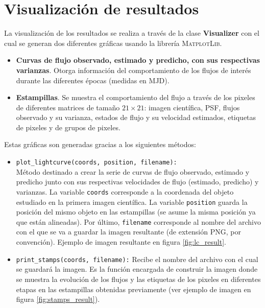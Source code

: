 \section{Visualizaci\'on de resultados}
La visualizaci\'on de los resultados se realiza a trav\'es de la clase \textbf{Visualizer} con el cual se generan dos diferentes gr\'aficas usando la librer\'ia \textsc{MatplotLib}. 
\begin{itemize}
\item \textbf{Curvas de flujo observado, estimado y predicho, con sus respectivas varianzas}. Otorga informaci\'on del comportamiento de los flujos de inter\'es durante las diferentes \'epocas (medidas en MJD). 
\item \textbf{Estampillas}. Se muestra el comportamiento del flujo a trav\'es de los pixeles de diferentes matrices de tama\~no $21 \times 21$: imagen cient\'ifica, PSF, flujos observado y su varianza, estados de flujo y su velocidad estimados, etiquetas de pixeles y de grupos de pixeles.
\end{itemize}

Estas gr\'aficas son generadas gracias a los siguientes m\'etodos:

\begin{itemize}
\item \texttt{plot\_lightcurve(coords, position, filename):}\\
M\'etodo destinado a crear la serie de curvas de flujo observado, estimado y predicho junto con sus respectivas velocidades de flujo (estimado, predicho) y varianzas. La variable \texttt{coords} corresponde a la coordenada del objeto estudiado en la primera imagen cient\'ifica. La variable \texttt{position} guarda la posici\'on del mismo objeto en las estampillas (se asume la misma posici\'on ya que est\'an alineadas). Por \'ultimo, \texttt{filename} corresponde al nombre del archivo con el que se va a guardar la imagen resultante (de extensi\'on PNG, por convenci\'on). Ejemplo de imagen resultante en figura \ref{fig:lc_result}.
\bigskip
 
\item \texttt{print\_stamps(coords, filename):}
Recibe el nombre del archivo con el cual se guardar\'a la imagen. Es la funci\'on encargada de construir la imagen donde se muestra la evoluci\'on de los flujos y las etiquetas de los pixeles en diferentes etapas en las estampillas obtenidas previamente (ver ejemplo de imagen en figura \ref{fig:stamps_result}).
\end{itemize}

